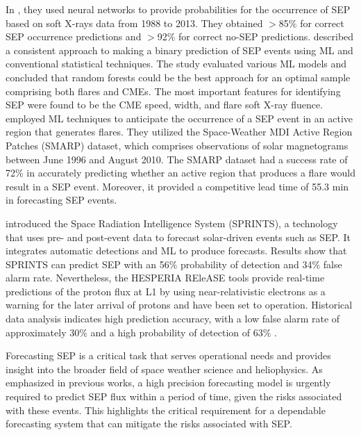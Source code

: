 In \citet{aminalragia_2021}, they used neural networks to provide probabilities for the occurrence of SEP based on soft X-rays data from 1988 to 2013. They obtained $>$85\% for correct SEP occurrence predictions and $>$92\% for correct no-SEP predictions.
\citet{lavasa_2021} described a consistent approach to making a binary prediction of SEP events using ML and conventional statistical techniques. The study evaluated various ML models and concluded that random forests could be the best approach for an optimal sample comprising both flares and CMEs. The most important features for identifying SEP were found to be the CME speed, width, and flare soft X-ray fluence.
\citet{kasapis_2022} employed ML techniques to anticipate the occurrence of a SEP event in an active region that generates flares. They utilized the Space-Weather MDI Active Region Patches (SMARP) dataset, which comprises observations of solar magnetograms between June 1996 and August 2010. The SMARP dataset had a success rate of 72\% in accurately predicting whether an active region that produces a flare would result in a SEP event. Moreover, it provided a competitive lead time of 55.3 min in forecasting SEP events.

\citet{engell_2017} introduced the Space Radiation Intelligence System (SPRINTS), a technology that uses pre- and post-event data to forecast solar-driven events such as SEP. It integrates automatic detections and ML to produce forecasts. Results show that SPRINTS can predict SEP with an 56\% probability of detection and 34\% false alarm rate.
Nevertheless, the HESPERIA REleASE tools provide real-time predictions of the proton flux at L1 by using near-relativistic electrons as a warning for the later arrival of protons and have been set to operation\citep{malandraki_2018}. Historical data analysis indicates high prediction accuracy, with a low false alarm rate of approximately 30\% and a high probability of detection of 63\% \citep{malandraki_2018}.

Forecasting SEP is a critical task that serves operational needs and provides insight into the broader field of space weather science and heliophysics. As emphasized in previous works, a high precision forecasting model is urgently required to predict SEP flux within a period of time, given the risks associated with these events. This highlights the critical requirement for a dependable forecasting system that can mitigate the risks associated with SEP.


